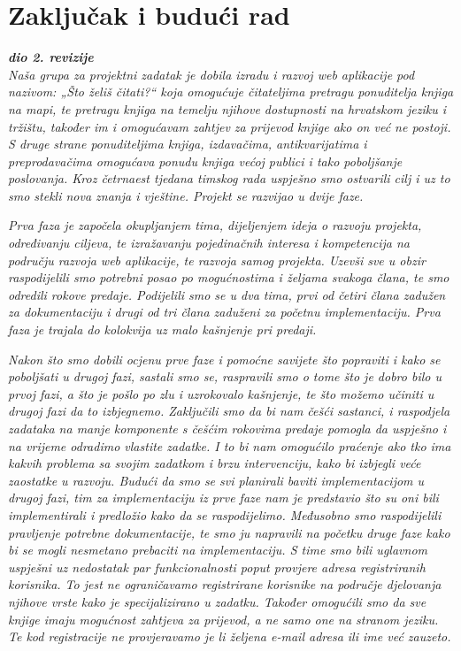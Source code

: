 \chapter{Zaključak i budući rad}
		
		\textbf{\textit{dio 2. revizije}}\\
		
		 \textit{Naša grupa za projektni zadatak je dobila izradu i razvoj web aplikacije pod nazivom: „Što želiš čitati?“  koja omogućuje čitateljima pretragu ponuditelja knjiga na mapi, te pretragu knjiga na temelju njihove dostupnosti na hrvatskom jeziku i tržištu, također im i omogućavam zahtjev za prijevod knjige ako on već ne postoji. S druge strane ponuditeljima knjiga, izdavačima, antikvarijatima i preprodavačima omogućava ponudu knjiga većoj publici i tako poboljšanje poslovanja. Kroz četrnaest tjedana timskog rada uspješno smo ostvarili cilj i uz to smo stekli nova znanja i vještine. Projekt se razvijao u dvije faze. }
		
		 \textit{Prva faza je započela okupljanjem tima, dijeljenjem ideja o razvoju projekta, određivanju ciljeva, te izražavanju pojedinačnih interesa i kompetencija na području razvoja web aplikacije, te razvoja samog projekta. Uzevši sve u obzir raspodijelili smo potrebni posao po mogućnostima i željama svakoga člana, te smo odredili rokove predaje. Podijelili smo se u dva tima, prvi od četiri člana zadužen za dokumentaciju i drugi od tri člana zaduženi za početnu implementaciju. Prva faza je trajala do kolokvija uz malo kašnjenje pri predaji.}
   
          \textit{Nakon što smo dobili ocjenu prve faze i pomoćne savijete što popraviti i kako se poboljšati u drugoj fazi, sastali smo se, raspravili smo o tome što je dobro bilo u prvoj fazi, a što je pošlo po zlu i uzrokovalo kašnjenje, te što možemo učiniti u drugoj fazi da to izbjegnemo. Zaključili smo da bi nam češći sastanci, i raspodjela zadataka na manje komponente s češćim rokovima predaje pomogla da uspješno i na vrijeme odradimo vlastite zadatke. I to bi nam omogućilo praćenje ako tko ima kakvih problema sa svojim zadatkom i brzu intervenciju, kako bi izbjegli veće zaostatke u razvoju.  Budući da smo se svi planirali baviti implementacijom u drugoj fazi, tim za implementaciju iz prve faze nam je predstavio što su oni bili implementirali i predložio kako da se raspodijelimo. Međusobno smo raspodijelili pravljenje potrebne dokumentacije, te smo ju napravili na početku druge faze kako bi se mogli nesmetano prebaciti na implementaciju.  S time smo bili uglavnom uspješni uz nedostatak par funkcionalnosti poput provjere adresa registriranih korisnika. To jest ne ograničavamo registrirane korisnike na područje djelovanja njihove vrste kako je specijalizirano u zadatku. Također omogućili smo da sve knjige imaju mogućnost zahtjeva za prijevod, a ne samo one na stranom jeziku.  Te kod registracije ne provjeravamo je li željena e-mail adresa ili ime već zauzeto.}
          
